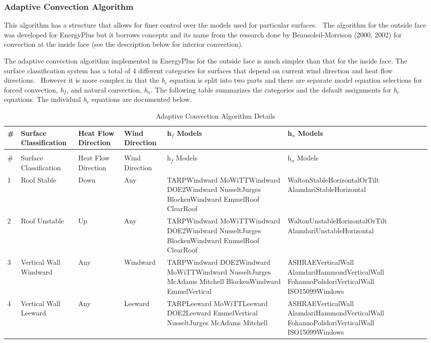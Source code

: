\subsubsection{Adaptive Convection Algorithm}\label{adaptive-convection-algorithm-000}

This algorithm has a structure that allows for finer control over the models used for particular surfaces.~ The algorithm for the outside face was developed for EnergyPlus but it borrows concepts and its name from the research done by Beausoleil-Morrison (2000, 2002) for convection at the inside face (see the description below for interior convection).

The adaptive convection algorithm implemented in EnergyPlus for the outside face is much simpler than that for the inside face. The surface classification system has a total of 4 different categories for surfaces that depend on current wind direction and heat flow directions.~ However it is more complex in that the \emph{h\(_{c}\)} equation is split into two parts and there are separate model equation selections for forced convection, \emph{h\(_{f}\)}, and natural convection, \emph{h\(_{n}\)}. The following table summarizes the categories and the default assignments for \emph{h\(_{c}\)} equations. The individual \emph{h\(_{c}\)} equations are documented below.

{\scriptsize
\begin{longtable}[c]{p{0.25in}p{0.75in}p{0.5in}p{0.5in}p{1.75in}p{1.75in}}

\caption{Adaptive Convection Algorithm Details \label{table:adaptive-convection-algorithm-details}} \tabularnewline
\toprule 
\# & Surface Classification & Heat Flow Direction & Wind Direction & h\(_f\) Models & h\(_n\) Models \tabularnewline
\midrule
\endfirsthead

\caption[]{Adaptive Convection Algorithm Details} \tabularnewline
\toprule 
\# & Surface Classification & Heat Flow Direction & Wind Direction & h\(_f\) Models & h\(_n\) Models \tabularnewline
\midrule
\endhead

1 & Roof Stable & Down & Any & TARPWindward MoWiTTWindward DOE2Windward NusseltJurges BlockenWindward EmmelRoof ClearRoof & WaltonStableHorizontalOrTilt AlamdariStableHorizontal \tabularnewline
2 & Roof Unstable & Up & Any & TARPWindward MoWiTTWindward DOE2Windward NusseltJurges BlockenWindward EmmelRoof ClearRoof & WaltonUnstableHorizontalOrTilt AlamdariUnstableHorizontal \tabularnewline
3 & Vertical Wall Windward & Any & Windward & TARPWindward DOE2Windward MoWiTTWindward NusseltJurges McAdams Mitchell BlockenWindward EmmelVertical & ASHRAEVerticalWall AlamdariHammondVerticalWall FohannoPolidoriVerticalWall ISO15099Windows \tabularnewline
4 & Vertical Wall Leeward & Any & Leeward & TARPLeeward MoWiTTLeeward DOE2Leeward EmmelVertical NusseltJurges McAdams Mitchell & ASHRAEVerticalWall AlamdariHammondVerticalWall FohannoPolidoriVerticalWall ISO15099Windows \tabularnewline
\bottomrule
\end{longtable}}

